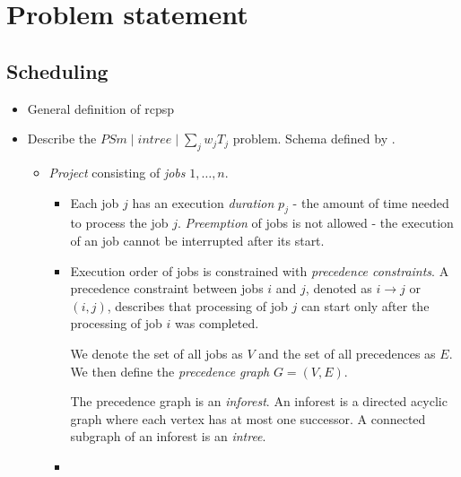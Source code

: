 \chapter{Problem statement}

\section{Scheduling}

\begin{itemize}
    \item General definition of \ac{rcpsp}

    \item Describe the $PSm \;|\; intree \;|\; \sum_{j} w_j T_j$ problem.
        Schema defined by \citet{BRUCKER1999}.
    \begin{itemize}
        \item \emph{Project} consisting of \emph{jobs} $1, \dots, n$.
        \begin{itemize}
            \item Each job $j$ has an execution \emph{duration} $p_j$ - the amount of time needed to process
                the job $j$. \emph{Preemption} of jobs is not allowed - the execution of an job
                cannot be interrupted after its start.

            \item Execution order of jobs is constrained with \emph{precedence constraints}.
                A precedence constraint between jobs $i$ and $j$, denoted as $i \rightarrow j$ or $(i, j)$,
                describes that processing of job $j$ can start only after the processing of job $i$
                was completed.

                We denote the set of all jobs as $V$ and the set of all precedences as $E$.
                We then define the \emph{precedence graph} $G = (V, E)$.
                
                The precedence graph is an \emph{inforest}. An inforest is a directed acyclic graph
                where each vertex has at most one successor. A connected subgraph of an inforest
                is an \emph{intree}.

            \item 
        \end{itemize}
        

\end{itemize}
\end{itemize}
